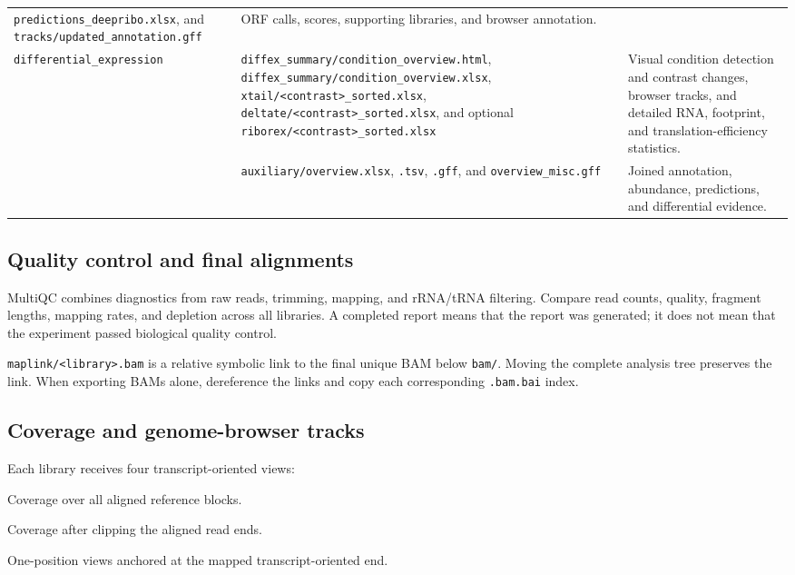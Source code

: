 \documentclass[11pt,a4paper]{article}
\newcommand{\setting}[1]{\texttt{\detokenize{#1}}}
\newcommand{\file}[1]{\nolinkurl{#1}}
\begin{document}
\begin{longtable}{@{}>{\raggedright\arraybackslash}p{}
                       >{\raggedright\arraybackslash}p{}
                       >{\raggedright\arraybackslash}p{}@{}}
\file{predictions_deepribo.xlsx}, and \file{tracks/updated_annotation.gff} &
ORF calls, scores, supporting libraries, and browser annotation. \\
\file{differential_expression} &
\file{diffex_summary/condition_overview.html},
\file{diffex_summary/condition_overview.xlsx},
\file{xtail/<contrast>_sorted.xlsx},
\file{deltate/<contrast>_sorted.xlsx}, and optional
\file{riborex/<contrast>_sorted.xlsx} &
Visual condition detection and contrast changes, browser tracks, and detailed
RNA, footprint, and translation-efficiency statistics. \\
\setting{overview} &
\file{auxiliary/overview.xlsx}, \file{.tsv}, \file{.gff}, and
\file{overview_misc.gff} &
Joined annotation, abundance, predictions, and differential evidence. \\
\bottomrule
\end{longtable}
\normalsize

\subsection{Quality control and final alignments}

MultiQC combines diagnostics from raw reads, trimming, mapping, and rRNA/tRNA
filtering. Compare read counts, quality, fragment lengths, mapping rates, and
depletion across all libraries. A completed report means that the report was
generated; it does not mean that the experiment passed biological quality
control.

\file{maplink/<library>.bam} is a relative symbolic link to the final unique
BAM below \file{bam/}. Moving the complete analysis tree preserves the link.
When exporting BAMs alone, dereference the links and copy each corresponding
\file{.bam.bai} index.

\subsection{Coverage and genome-browser tracks}

Each library receives four transcript-oriented views:

\begin{description}[style=nextline,leftmargin=1.6em]
  \item[\setting{global}] Coverage over all aligned reference blocks.
  \item[\setting{centered}] Coverage after clipping the aligned read ends.
  \item[\setting{fiveprime} and \setting{threeprime}]
        One-position views anchored at the mapped transcript-oriented end.
\end{description}
\end{document}
